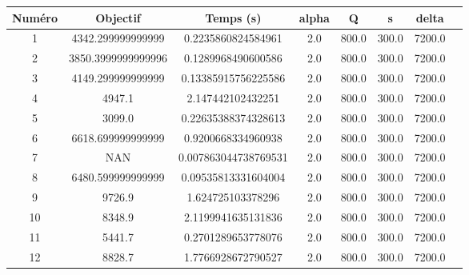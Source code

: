 \begin{tabular}{|c|c|c|c|c|c|c|c|}
\hline
 Numéro & Objectif & Temps (s) & alpha & Q & s & delta \\
\hline
1 & 4342.299999999999 & 0.2235860824584961 & 2.0 & 800.0 & 300.0 & 7200.0 \\ 
 \hline
2 & 3850.3999999999996 & 0.1289968490600586 & 2.0 & 800.0 & 300.0 & 7200.0 \\ 
 \hline
3 & 4149.299999999999 & 0.13385915756225586 & 2.0 & 800.0 & 300.0 & 7200.0 \\ 
 \hline
4 & 4947.1 & 2.147442102432251 & 2.0 & 800.0 & 300.0 & 7200.0 \\ 
 \hline
5 & 3099.0 & 0.22635388374328613 & 2.0 & 800.0 & 300.0 & 7200.0 \\ 
 \hline
6 & 6618.699999999999 & 0.9200668334960938 & 2.0 & 800.0 & 300.0 & 7200.0 \\ 
 \hline
7 & NAN & 0.007863044738769531 & 2.0 & 800.0 & 300.0 & 7200.0 \\ 
 \hline
8 & 6480.599999999999 & 0.09535813331604004 & 2.0 & 800.0 & 300.0 & 7200.0 \\ 
 \hline
9 & 9726.9 & 1.624725103378296 & 2.0 & 800.0 & 300.0 & 7200.0 \\ 
 \hline
10 & 8348.9 & 2.1199941635131836 & 2.0 & 800.0 & 300.0 & 7200.0 \\ 
 \hline
11 & 5441.7 & 0.2701289653778076 & 2.0 & 800.0 & 300.0 & 7200.0 \\ 
 \hline
12 & 8828.7 & 1.7766928672790527 & 2.0 & 800.0 & 300.0 & 7200.0 \\ 
 \hline
\end{tabular}
